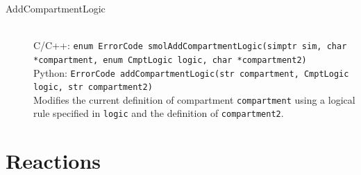 \documentclass {scrbook}
\newcommand {\ttt} {\texttt}
\begin{document}
\begin{description}
\item[AddCompartmentLogic]
\hfill \\
C/C++: \ttt{enum ErrorCode smolAddCompartmentLogic(simptr sim, char *compartment, enum CmptLogic logic, char *compartment2)}\\
Python: \ttt{ErrorCode addCompartmentLogic(str compartment, CmptLogic logic, str compartment2)}\\
Modifies the current definition of compartment \ttt{compartment} using a logical rule specified in \ttt{logic} and the definition of \ttt{compartment2}.

\end{description}

\section{Reactions}
\end{document}
